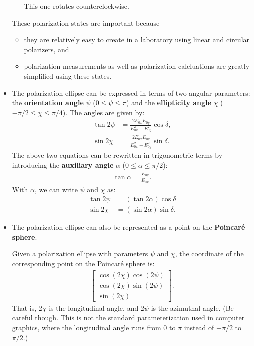 \documentclass[10pt]{article}
\begin{document}
\begin{itemize}
\begin{itemize}
\begin{center}
			\end{center}
			This one rotates counterclockwise.
		\end{itemize}
		These polarization states are important because
		\begin{itemize}
			\item they are relatively easy to create in a laboratory using linear and circular polarizers, and
			\item polarization measurements as well as polarization calcluations are greatly simplified using these states.
		\end{itemize}

		\item The polarization ellipse can be expressed in terms of two angular parameters: the \textbf{orientation angle} $\psi$ ($0 \leq \psi \leq \pi$) and the \textbf{ellipticity angle} $\chi$ ($-\pi/2 \leq \chi \leq \pi/4$).  The angles are given by:
		\begin{align*}
			\tan 2\psi &= \frac{2 E_{0x}E_{0y}}{E_{0x}^2 - E_{0y}^2} \cos\delta, \\
			\sin 2\chi &= \frac{2E_{0x} E_{0y}}{E_{0x}^2 + E_{0y}^2} \sin\delta.
		\end{align*}
		The above two equations can be rewritten in trigonometric terms by introducing the \textbf{auxiliary angle} $\alpha$ ($0 \leq \alpha \leq \pi/2$):
		\begin{align*}
			\tan \alpha = \frac{E_{0y}}{E_{0x}}.
		\end{align*}
		With $\alpha$, we can write $\psi$ and $\chi$ as:
		\begin{align*}
			\tan 2\psi &= (\tan 2\alpha) \cos \delta \\
			\sin 2\chi &= (\sin 2\alpha) \sin \delta.
		\end{align*}

		\item The polarization ellipse can also be represented as a point on the \textbf{Poincar\'{e} sphere}.  

		Given a polarization ellipse with parameters $\psi$ and $\chi$, the coordinate of the corresponding point on the Poincar\'{e} sphere is:
		\begin{align*}
			\begin{bmatrix}
				\cos(2\chi) \cos (2\psi) \\
				\cos(2\chi) \sin (2\psi) \\
				\sin (2\chi)
			\end{bmatrix}.
		\end{align*}
		That is, $2\chi$ is the longitudinal angle, and $2\psi$ is the azimuthal angle.  (Be careful though.  This is not the standard parameterization used in computer graphics, where the longitudinal angle runs from $0$ to $\pi$ instead of $-\pi/2$ to $\pi/2$.)


\end{itemize}
\end{document}
